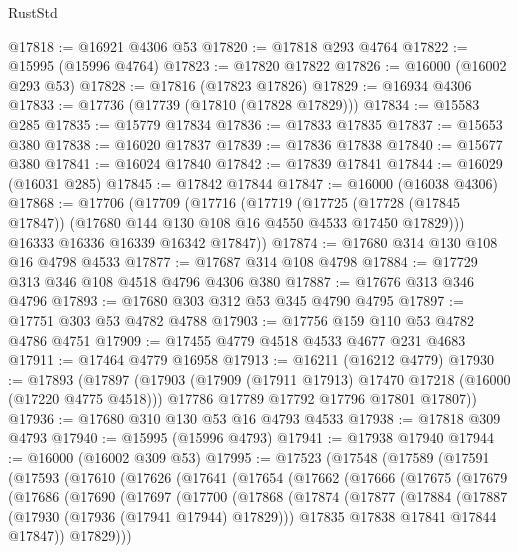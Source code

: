\begin{lexlean}{RustStd}
\begin{coremodule}
{\begin{coremodule}
{{{{{{{{{{{{{{{{{{{{{{{{{{{{{{{{{{{{{{{{{{{{{{{{{{{{{{{{{{{{@17818 := @16921 @4306 @53
@17820 := @17818 @293 @4764
@17822 := @15995 (@15996 @4764)
@17823 := @17820 @17822
@17826 := @16000 (@16002 @293 @53)
@17828 := @17816 (@17823 @17826)
@17829 := @16934 @4306
@17833 := @17736 (@17739 (@17810 (@17828 @17829)))
@17834 := @15583 @285
@17835 := @15779 @17834
@17836 := @17833 @17835
@17837 := @15653 @380
@17838 := @16020 @17837
@17839 := @17836 @17838
@17840 := @15677 @380
@17841 := @16024 @17840
@17842 := @17839 @17841
@17844 := @16029 (@16031 @285)
@17845 := @17842 @17844
@17847 := @16000 (@16038 @4306)
@17868 := @17706
    (@17709
      (@17716
        (@17719
          (@17725 (@17728 (@17845 @17847)) (@17680 @144 @130 @108 @16 @4550 @4533 @17450 @17829)))
        @16333
        @16336
        @16339
        @16342
        @17847))
@17874 := @17680 @314 @130 @108 @16 @4798 @4533
@17877 := @17687 @314 @108 @4798
@17884 := @17729 @313 @346 @108 @4518 @4796 @4306 @380
@17887 := @17676 @313 @346 @4796
@17893 := @17680 @303 @312 @53 @345 @4790 @4795
@17897 := @17751 @303 @53 @4782 @4788
@17903 := @17756 @159 @110 @53 @4782 @4786 @4751
@17909 := @17455 @4779 @4518 @4533 @4677 @231 @4683
@17911 := @17464 @4779 @16958
@17913 := @16211 (@16212 @4779)
@17930 := @17893
    (@17897
      (@17903
        (@17909 (@17911 @17913) @17470 @17218 (@16000 (@17220 @4775 @4518)))
        @17786
        @17789
        @17792
        @17796
        @17801
        @17807))
@17936 := @17680 @310 @130 @53 @16 @4793 @4533
@17938 := @17818 @309 @4793
@17940 := @15995 (@15996 @4793)
@17941 := @17938 @17940
@17944 := @16000 (@16002 @309 @53)
@17995 := @17523
    (@17548
      (@17589
        (@17591
          (@17593
            (@17610
              (@17626
                (@17641
                  (@17654
                    (@17662
                      (@17666
                        (@17675
                          (@17679
                            (@17686
                              (@17690
                                (@17697
                                  (@17700
                                    (@17868
                                      (@17874
                                        (@17877
                                          (@17884
                                            (@17887 (@17930 (@17936 (@17941 @17944) @17829)))
                                            @17835
                                            @17838
                                            @17841
                                            @17844
                                            @17847))
                                        @17829)))
}}}}}}}}}}}}}}}}}}}}}}}}}}}}}}}}}}}}}}}}}}}}}}}}}}}}}}}}}}}}
\end{coremodule}}
\end{coremodule}
\end{lexlean}
